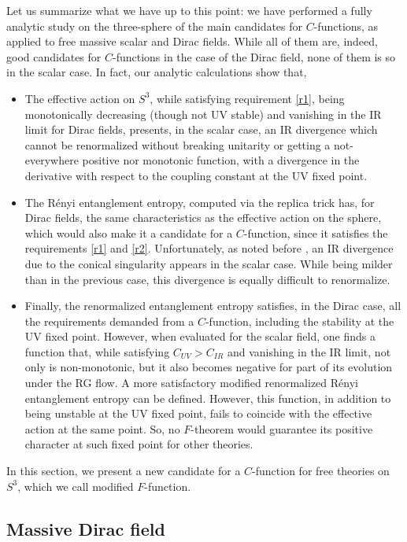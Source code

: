\documentclass[12pt,a4paper]{article}
\numberwithin{equation}{section}
\begin{document}
Let us summarize what we have up to this point: we have performed a fully analytic study on the three-sphere of the main candidates for $C$-functions, as applied to free massive scalar and Dirac fields. While all of them are, indeed, good candidates for $C$-functions in the case of the Dirac field, none of them is so in the scalar case. In fact, our analytic calculations show that,
\begin{itemize}
  \item The effective action on $S^3$, while satisfying requirement \ref{r1}, being monotonically decreasing (though not UV stable) and vanishing in the IR limit for Dirac fields, presents, in the scalar case, an IR divergence which cannot be renormalized without breaking unitarity or getting a not-everywhere positive nor monotonic function, with a divergence in the derivative with respect to the coupling constant at the UV fixed point.
%
    \item The R\'enyi entanglement entropy, computed via the replica trick has, for Dirac fields, the same characteristics as the effective action on the sphere, which would also make it a candidate for a $C$-function, since it satisfies the requirements \ref{r1} and \ref{r2}. Unfortunately, as noted before \cite{dowkerrenyi}, an IR divergence due to the conical singularity appears in the scalar case. While being milder than in the previous case, this divergence is equally difficult to renormalize.
%
      \item Finally, the renormalized entanglement entropy satisfies, in the Dirac case, all the requirements demanded from a $C$-function, including the stability at the UV fixed point. However, when evaluated for the scalar field, one finds a function that, while satisfying $C_{UV}>C_{IR}$ and vanishing in the IR limit, not only is non-monotonic, but it also becomes negative for part of its evolution under the RG flow. A more satisfactory modified renormalized R\'enyi entanglement entropy can be defined. However, this function, in addition to being unstable at the UV fixed point, fails to coincide with the effective action at the same point. So, no $F$-theorem would guarantee its positive character at such fixed point for other theories.
\end{itemize}

In this section, we present a new candidate for a $C$-function for free theories on $S^3$, which we call modified $F$-function.

\subsection{Massive Dirac field}
\end{document}
